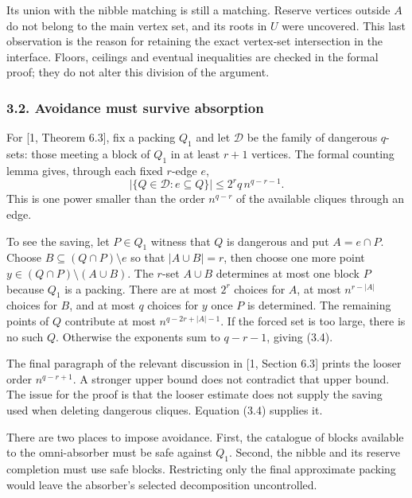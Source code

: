 \documentclass[english,11pt,a4paper]{article}
\begin{document}
Its union with the nibble matching is still a matching. Reserve vertices outside \(A\) do not belong to the main vertex set, and its roots in \(U\) were uncovered. This last observation is the reason for retaining the exact vertex-set intersection in the interface. Floors, ceilings and eventual inequalities are checked in the formal proof; they do not alter this division of the argument.


\subsubsection{3.2. Avoidance must survive absorption}\label{avoidance-must-survive-absorption}

For {[}1, Theorem 6.3{]}, fix a packing \(Q_1\) and let \(\mathcal D\) be the family of dangerous \(q\)-sets: those meeting a block of \(Q_1\) in at least \(r+1\) vertices. The formal counting lemma gives, through each fixed \(r\)-edge \(e\), \[|\{Q\in\mathcal D:e\subseteq Q\}|
\le 2^r q\,n^{q-r-1}.
\tag{3.4}\] This is one power smaller than the order \(n^{q-r}\) of the available cliques through an edge.

To see the saving, let \(P\in Q_1\) witness that \(Q\) is dangerous and put \(A=e\cap P\). Choose \(B\subseteq(Q\cap P)\setminus e\) so that \(|A\cup B|=r\), then choose one more point \(y\in(Q\cap P)\setminus(A\cup B)\). The \(r\)-set \(A\cup B\) determines at most one block \(P\) because \(Q_1\) is a packing. There are at most \(2^r\) choices for \(A\), at most \(n^{r-|A|}\) choices for \(B\), and at most \(q\) choices for \(y\) once \(P\) is determined. The remaining points of \(Q\) contribute at most \(n^{q-2r+|A|-1}\). If the forced set is too large, there is no such \(Q\). Otherwise the exponents sum to \(q-r-1\), giving (3.4).

The final paragraph of the relevant discussion in {[}1, Section 6.3{]} prints the looser order \(n^{q-r+1}\). A stronger upper bound does not contradict that upper bound. The issue for the proof is that the looser estimate does not supply the saving used when deleting dangerous cliques. Equation (3.4) supplies it.

There are two places to impose avoidance. First, the catalogue of blocks available to the omni-absorber must be safe against \(Q_1\). Second, the nibble and its reserve completion must use safe blocks. Restricting only the final approximate packing would leave the absorber's selected decomposition uncontrolled.
\end{document}
